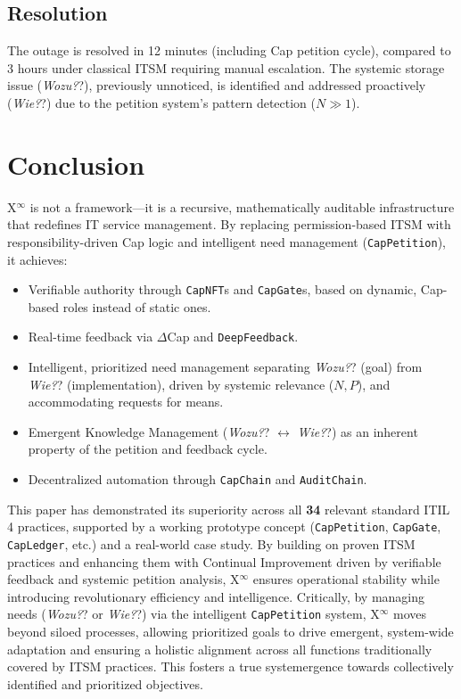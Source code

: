 \documentclass[12pt, a4paper]{scrartcl}
\newcommand{\Xinf}{X$^\infty$}                        %
\newcommand{\DeltaCap}{$\Delta$Cap}                    %
\newcommand{\CapLedger}{\texttt{CapLedger}}          %
\newcommand{\CapNFT}{\texttt{CapNFT}}
\newcommand{\CapGate}{\texttt{CapGate}}
\newcommand{\CapChain}{\texttt{CapChain}}
\newcommand{\AuditChain}{\texttt{AuditChain}}
\newcommand{\CapPetition}{\texttt{CapPetition}}        %
\newcommand{\Wozu}{\textit{Wozu?}}                      %
\newcommand{\Wie}{\textit{Wie?}}                        %
\begin{document}
\subsection{Resolution}

The outage is resolved in 12 minutes (including Cap petition cycle), compared to 3 hours under classical ITSM requiring manual escalation. The systemic storage issue (\Wozu?), previously unnoticed, is identified and addressed proactively (\Wie?) due to the petition system's pattern detection ($N \gg 1$).


\section{Conclusion}
\Xinf{} is not a framework—it is a recursive, mathematically auditable infrastructure that redefines IT service management. By replacing permission-based ITSM with responsibility-driven Cap logic and intelligent need management (\CapPetition{}), it achieves:
\begin{itemize}
    \item Verifiable authority through \CapNFT{}s and \CapGate{}s, based on dynamic, Cap-based roles instead of static ones.
    \item Real-time feedback via \DeltaCap{} and \texttt{DeepFeedback}.
    \item Intelligent, prioritized need management separating \Wozu? (goal) from \Wie? (implementation), driven by systemic relevance ($N, P$), and accommodating requests for means.
    \item Emergent Knowledge Management (\Wozu? $\leftrightarrow$ \Wie?) as an inherent property of the petition and feedback cycle.
    \item Decentralized automation through \CapChain{} and \AuditChain{}.
\end{itemize}
This paper has demonstrated its superiority across all \textbf{34} relevant standard ITIL 4 practices, supported by a working prototype concept (\CapPetition{}, \CapGate{}, \CapLedger{}, etc.) and a real-world case study. By building on proven ITSM practices and enhancing them with Continual Improvement driven by verifiable feedback and systemic petition analysis, \Xinf{} ensures operational stability while introducing revolutionary efficiency and intelligence. Critically, by managing needs (\Wozu? or \Wie?) via the intelligent \CapPetition{} system, \Xinf{} moves beyond siloed processes, allowing prioritized goals to drive emergent, system-wide adaptation and ensuring a holistic alignment across all functions traditionally covered by ITSM practices. This fosters a true systemergence towards collectively identified and prioritized objectives.
\end{document}
